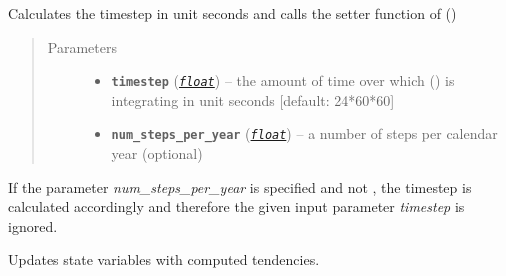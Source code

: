 \documentclass[a4paper,10pt,english]{sphinxmanual}
\begin{document}
\begin{fulllineitems}
\begin{fulllineitems}
\label{api/climlab.process:climlab.process.time_dependent_process.TimeDependentProcess.set_timestep}
Calculates the timestep in unit seconds
and calls the setter function of {\hyperref[api/climlab.process:climlab.process.time_dependent_process.TimeDependentProcess.timestep]{\emph{}}} ()
\begin{quote}\begin{description}
\item[{Parameters}] \leavevmode\begin{itemize}
\item {} 
\textbf{\texttt{timestep}} (\href{http://docs.python.org/2.7/library/functions.html\#float}{\emph{\texttt{float}}}) -- the amount of time over which 
{\hyperref[api/climlab.process:climlab.process.time_dependent_process.TimeDependentProcess.step_forward]{\emph{}}} () is integrating 
in unit seconds {[}default: 24*60*60{]}

\item {} 
\textbf{\texttt{num\_steps\_per\_year}} (\href{http://docs.python.org/2.7/library/functions.html\#float}{\emph{\texttt{float}}}) -- a number of steps per calendar year 
(optional)

\end{itemize}

\end{description}\end{quote}

If the parameter \emph{num\_steps\_per\_year} is specified and not , 
the timestep is calculated accordingly and therefore the given input
parameter \emph{timestep} is ignored.

\end{fulllineitems}


\begin{fulllineitems}
\label{api/climlab.process:climlab.process.time_dependent_process.TimeDependentProcess.step_forward}
Updates state variables with computed tendencies.


\end{fulllineitems}
\end{fulllineitems}
\end{document}
